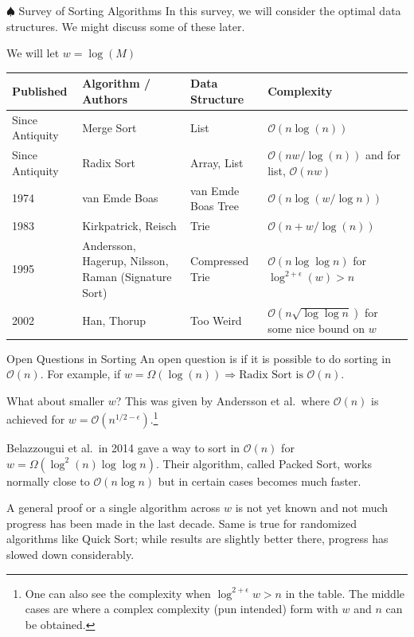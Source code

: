 \documentclass[9pt]{beamer}
\begin{document}
\begin{frame}{$\spadesuit$ Survey of Sorting Algorithms}
\footnotesize
In this survey, we will consider the optimal data structures. We might discuss some of these later.

We will let $w = \log(M)$
\vspace{0.3cm}

\begin{tabularx}{\textwidth}{lXXX}
\toprule
\textbf{Published} & \textbf{Algorithm / Authors} & \textbf{Data Structure} & \textbf{Complexity} \\
\midrule
Since Antiquity & Merge Sort & List & $\mathcal{O}(n\log(n))$ \\
Since Antiquity & Radix Sort & Array, List & $\mathcal{O}(nw/\log(n))$ and for list, $\mathcal{O}(nw)$ \\
1974 & van Emde Boas & van Emde Boas Tree & $\mathcal{O}(n\log(w/\log n))$ \\
1983 & Kirkpatrick, Reisch & Trie & $\mathcal{O}(n + w/\log(n))$ \\
1995 & Andersson, Hagerup, Nilsson, Raman (Signature Sort) & Compressed Trie & $\mathcal{O}(n\log\log n)$ for $\log^{2+\epsilon}(w) > n$ \\
2002 & Han, Thorup & Too Weird & $\mathcal{O}(n\sqrt{\log\log n})$ for some nice bound on $w$\footnotemark \\
\bottomrule
\end{tabularx}
\end{frame}

\begin{frame}{Open Questions in Sorting}
An open question is if it is possible to do sorting in $\mathcal{O}(n)$. For example, if $w = \Omega(\log(n)) \Rightarrow \text{Radix Sort is } \mathcal{O}(n)$.

What about smaller $w$? This was given by Andersson et al.\ where $\mathcal{O}(n)$ is achieved for $w = \mathcal{O}(n^{1/2-\epsilon})$.\footnote{One can also see the complexity when $\log^{2+\epsilon} w > n$ in the table. The middle cases are where a complex complexity (pun intended) form with $w$ and $n$ can be obtained.}

Belazzougui et al.\ in 2014 gave a way to sort in $\mathcal{O}(n)$ for $w = \Omega(\log^2(n)\log\log n)$. Their algorithm, called Packed Sort, works normally close to $\mathcal{O}(n\log n)$ but in certain cases becomes much faster.

A general proof or a single algorithm across $w$ is not yet known and not much progress has been made in the last decade. Same is true for randomized algorithms like Quick Sort; while results are slightly better there, progress has slowed down considerably.
\end{frame}
\end{document}
